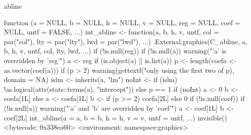 \begin{Schunk}
\begin{Sinput}
 abline
\end{Sinput}
\begin{Soutput}
function (a = NULL, b = NULL, h = NULL, v = NULL, reg = NULL, 
    coef = NULL, untf = FALSE, ...) 
{
    int_abline <- function(a, b, h, v, untf, col = par("col"), 
        lty = par("lty"), lwd = par("lwd"), ...) .External.graphics(C_abline, 
        a, b, h, v, untf, col, lty, lwd, ...)
    if (!is.null(reg)) {
        if (!is.null(a)) 
            warning("'a' is overridden by 'reg'")
        a <- reg
    }
    if (is.object(a) || is.list(a)) {
        p <- length(coefa <- as.vector(coef(a)))
        if (p > 2) 
            warning(gettextf("only using the first two of %d regression coefficients", 
                p), domain = NA)
        islm <- inherits(a, "lm")
        noInt <- if (islm) 
            !as.logical(attr(stats::terms(a), "intercept"))
        else p == 1
        if (noInt) {
            a <- 0
            b <- coefa[1L]
        }
        else {
            a <- coefa[1L]
            b <- if (p >= 2) 
                coefa[2L]
            else 0
        }
    }
    if (!is.null(coef)) {
        if (!is.null(a)) 
            warning("'a' and 'b' are overridden by 'coef'")
        a <- coef[1L]
        b <- coef[2L]
    }
    int_abline(a = a, b = b, h = h, v = v, untf = untf, ...)
    invisible()
}
<bytecode: 0x338ea60>
<environment: namespace:graphics>
\end{Soutput}
\end{Schunk}
